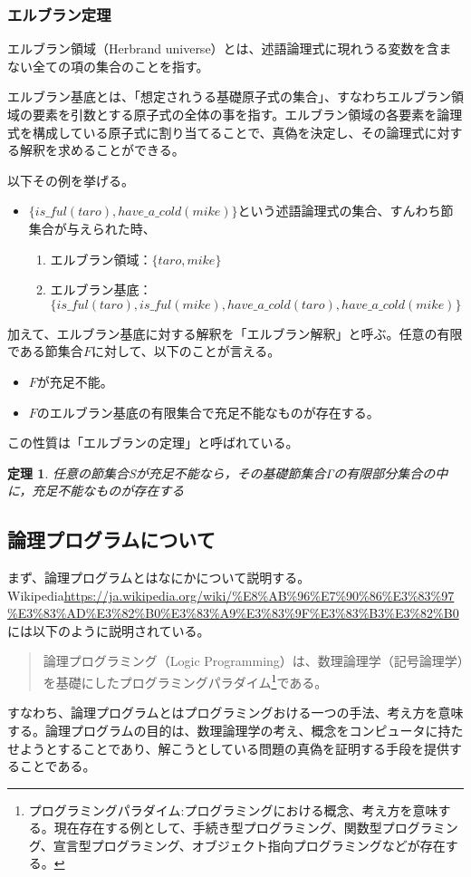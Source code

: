 \documentclass[dvipdfmx]{jsarticle}
\newtheorem{thm}{定理}
\begin{document}
\subsubsection{エルブラン定理}
エルブラン領域（Herbrand universe）とは、述語論理式に現れうる変数を含まない全ての項の集合のことを指す。\par
エルブラン基底とは、「想定されうる基礎原子式の集合」、すなわちエルブラン領域の要素を引数とする原子式の全体の事を指す。エルブラン領域の各要素を論理式を構成している原子式に割り当てることで、真偽を決定し、その論理式に対する解釈を求めることができる。\par
以下その例を挙げる。
\begin{itemize}
  \item $\{is\_ful(taro), have\_a\_cold(mike)\}$という述語論理式の集合、すんわち節集合が与えられた時、
  \begin{enumerate}
    \item エルブラン領域：$\{taro, mike\}$
    \item エルブラン基底：$\{is\_ful(taro), is\_ful(mike), have\_a\_cold(taro), have\_a\_cold(mike)\}$
  \end{enumerate}
\end{itemize}
加えて、エルブラン基底に対する解釈を「エルブラン解釈」と呼ぶ。任意の有限である節集合$F$に対して、以下のことが言える。
\begin{itemize}
  \item $F$が充足不能。
  \item $F$のエルブラン基底の有限集合で充足不能なものが存在する。
\end{itemize}
この性質は「エルブランの定理」と呼ばれている。
\begin{thm}
  任意の節集合Sが充足不能なら，その基礎節集合Γの有限部分集合の中に，充足不能なものが存在する
\end{thm}
\subsection{論理プログラムについて}
まず、論理プログラムとはなにかについて説明する。Wikipedia\url{https://ja.wikipedia.org/wiki/%E8%AB%96%E7%90%86%E3%83%97%E3%83%AD%E3%82%B0%E3%83%A9%E3%83%9F%E3%83%B3%E3%82%B0}には以下のように説明されている。
\begin{quote}
  論理プログラミング（Logic Programming）は、数理論理学（記号論理学）を基礎にしたプログラミングパラダイム\footnote{プログラミングパラダイム:プログラミングにおける概念、考え方を意味する。現在存在する例として、手続き型プログラミング、関数型プログラミング、宣言型プログラミング、オブジェクト指向プログラミングなどが存在する。}である。
\end{quote}
すなわち、論理プログラムとはプログラミングおける一つの手法、考え方を意味する。論理プログラムの目的は、数理論理学の考え、概念をコンピュータに持たせようとすることであり、解こうとしている問題の真偽を証明する手段を提供することである。
\end{document}
